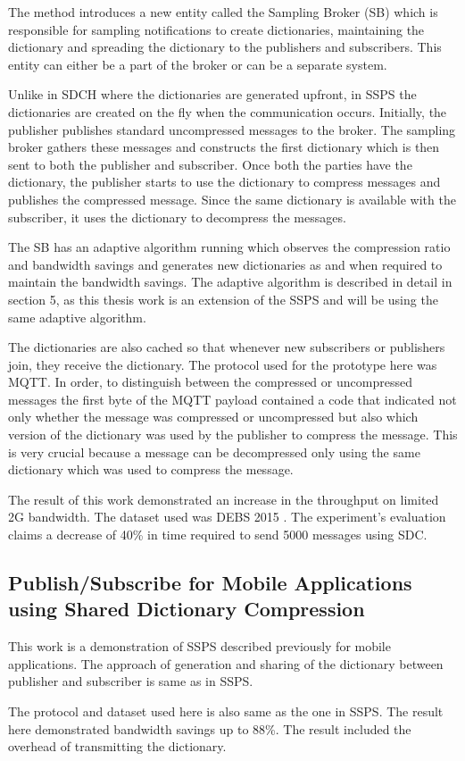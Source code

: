 The method introduces a new entity called the Sampling Broker (SB) which is responsible for sampling notifications to create dictionaries, maintaining the dictionary and spreading the dictionary to the publishers and subscribers. This entity can either be a part of the broker or can be a separate system. 

Unlike in SDCH where the dictionaries are generated upfront, in SSPS the dictionaries are created on the fly when the communication occurs. Initially, the publisher publishes standard uncompressed messages to the broker. The sampling broker gathers these messages and constructs the first dictionary which is then sent to both the publisher and subscriber. Once both the parties have the dictionary, the publisher starts to use the dictionary to compress messages and publishes the compressed message. Since the same dictionary is available with the subscriber, it uses the dictionary to decompress the messages.

The SB has an adaptive algorithm running which observes the compression ratio and bandwidth savings and generates new dictionaries as and when required to maintain the bandwidth savings. The adaptive algorithm is described in detail in section 5, as this thesis work is an extension of the SSPS and will be using the same adaptive algorithm. 

The dictionaries are also cached so that whenever new subscribers or publishers join, they receive the dictionary. The protocol used for the prototype here was MQTT. In order, to distinguish between the compressed or uncompressed messages the first byte of the MQTT payload contained a code that indicated not only whether the message was compressed or uncompressed but also which version of the dictionary was used by the publisher to compress the message. This is very crucial because a message can be decompressed only using the same dictionary which was used to compress the message. 

The result of this work demonstrated an increase in the throughput on limited 2G bandwidth. The dataset used was DEBS 2015 \parencite{debs2015}. The experiment's evaluation claims a decrease of 40\% in time required to send 5000 messages using SDC.


\subsection{Publish/Subscribe for Mobile Applications using Shared Dictionary Compression}

This work is a demonstration of SSPS described previously for mobile applications. The approach of generation and sharing of the dictionary between publisher and subscriber is same as in SSPS.

The protocol and dataset used here is also same as the one in SSPS. The result here demonstrated bandwidth savings up to 88\%. The result included the overhead of transmitting the dictionary.